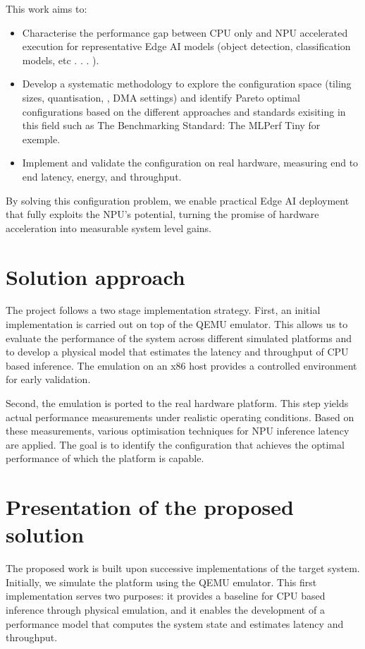 This work aims to:
\begin{itemize}
    \item Characterise the performance gap between CPU only and NPU accelerated execution for representative Edge AI models (object detection, classification models, etc . . . ).
    \item Develop a systematic methodology to explore the configuration space (tiling sizes, quantisation, , DMA settings) and identify Pareto optimal configurations based on the different approaches and standards exisiting in this field such as The Benchmarking Standard: The MLPerf Tiny for exemple.
    \item Implement and validate the configuration on real hardware, measuring end to end latency, energy, and throughput.
\end{itemize}
By solving this configuration problem, we enable practical Edge AI deployment that fully exploits the NPU’s potential, turning the promise of hardware acceleration into measurable system level gains.

\section{Solution approach}
The project follows a two stage implementation strategy. First, an initial implementation is carried out on top of the QEMU emulator. This allows us to evaluate the performance of the system across different simulated platforms and to develop a physical model that estimates the latency and throughput of CPU based inference. The emulation on an x86 host provides a controlled environment for early validation.

Second, the emulation is ported to the real hardware platform. This step yields actual performance measurements under realistic operating conditions. Based on these measurements, various optimisation techniques for NPU inference latency are applied. The goal is to identify the configuration that achieves the optimal performance of which the platform is capable.

\section{Presentation of the proposed solution}
The proposed work is built upon successive implementations of the target system. Initially, we simulate the platform using the QEMU emulator. This first implementation serves two purposes: it provides a baseline for CPU based inference through physical emulation, and it enables the development of a performance model that computes the system state and estimates latency and throughput.

